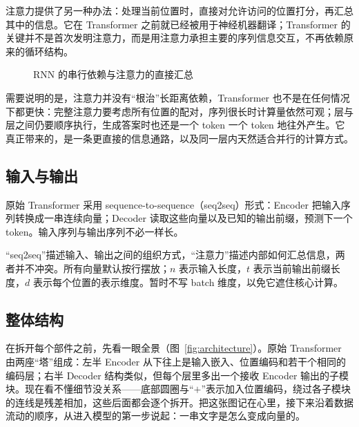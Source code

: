 \documentclass[UTF8,a4paper,12pt]{ctexart}
\numberwithin{equation}{section}
\begin{document}
注意力提供了另一种办法：处理当前位置时，直接对允许访问的位置打分，再汇总其中的信息。它在 Transformer 之前就已经被用于神经机器翻译；Transformer 的关键并不是首次发明注意力，而是用注意力承担主要的序列信息交互，不再依赖原来的循环结构。

\begin{figure}[htbp]
\centering
{}
\caption{RNN 的串行依赖与注意力的直接汇总}
\label{fig:motivation}
\end{figure}

需要说明的是，注意力并没有``根治''长距离依赖，Transformer 也不是在任何情况下都更快：完整注意力要考虑所有位置的配对，序列很长时计算量依然可观；层与层之间仍要顺序执行，生成答案时也还是一个 token 一个 token 地往外产生。它真正带来的，是一条更直接的信息通路，以及同一层内天然适合并行的计算方式。

\subsection{输入与输出}

原始 Transformer 采用 sequence-to-sequence（seq2seq）形式：Encoder 把输入序列转换成一串连续向量；Decoder 读取这些向量以及已知的输出前缀，预测下一个 token。输入序列与输出序列不必一样长。

``seq2seq''描述输入、输出之间的组织方式，``注意力''描述内部如何汇总信息，两者并不冲突。所有向量默认按行摆放；$n$ 表示输入长度，$t$ 表示当前输出前缀长度，$d$ 表示每个位置的表示维度。暂时不写 batch 维度，以免它遮住核心计算。

\subsection{整体结构}

在拆开每个部件之前，先看一眼全景（图~\ref{fig:architecture}）。原始 Transformer 由两座``塔''组成：左半 Encoder 从下往上是输入嵌入、位置编码和若干个相同的编码层；右半 Decoder 结构类似，但每个层里多出一个接收 Encoder 输出的子模块。现在看不懂细节没关系——底部圆圈与``$+$''表示加入位置编码，绕过各子模块的连线是残差相加，这些后面都会逐个拆开。把这张图记在心里，接下来沿着数据流动的顺序，从进入模型的第一步说起：一串文字是怎么变成向量的。
\end{document}
